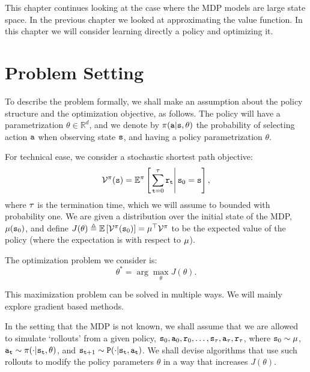 This chapter continues looking at the case where the MDP models are
large state space. In the previous chapter we looked at
approximating the value function. In this chapter we will consider
learning directly a policy and optimizing it.

\section{Problem Setting}

To describe the problem formally, we shall make an assumption about the policy structure and the optimization objective, as follows. 
The policy will have a
parametrization $\theta\in \mathbb{R}^{d}$, and we denote by 
$\pi({\tt a}|{\tt s},\theta)$ the probability of
selecting action ${\tt a}$ when observing state ${\tt s}$, and having a policy parametrization
$\theta$. 

For technical ease, we consider a stochastic shortest path objective:
\[\mathcal{V}^\pi({\tt s}) = \mathbb E^{\pi }\left[\left.\sum\limits_{{\tt t} = 0}^\tau {{{\tt r}_{\tt t}}} \right|{\tt s}_0 = {\tt s}\right],\]
where $\tau$ is the termination time, which we will assume to bounded with probability one.
We are given a distribution over the initial state of the MDP, $\mu({\tt s}_0)$, and define $J(\theta) \triangleq \mathbb{E}\left[ \mathcal{V}^\pi({\tt s}_0)\right] = \mu^\top \mathcal{V}^\pi$ to be the expected value of the policy (where the expectation is with respect to $\mu$).

The optimization problem we consider is:
\begin{equation}\label{eq:policy_opt}
\theta^* = \arg\max_\theta J(\theta).
\end{equation}

%
This maximization problem can be solved in multiple ways. We will
mainly explore gradient based methods.

In the setting that the MDP is not known, we shall assume that we are allowed to simulate `rollouts' from a given policy, ${\tt s}_0,{\tt a}_0,{\tt r}_0,\dots,{\tt s}_\tau, {\tt a}_\tau, {\tt r}_\tau$, where ${\tt s}_0 \sim \mu$, ${\tt a}_{\tt t}\sim \pi(\cdot|{\tt s}_{\tt t},\theta)$, and ${\tt s}_{{\tt t}+1} \sim {\tt P} (\cdot | {\tt s}_{\tt t}, {\tt a}_{\tt t})$. We shall devise algorithms that use such rollouts to modify the policy parameters $\theta$ in a way that increases $J(\theta)$.

